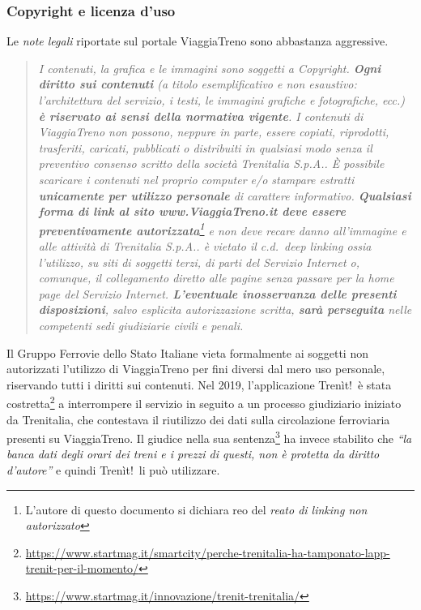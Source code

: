 \documentclass[italian,11pt,a4paper,final]{article}
\begin{document}
	\subsubsection{Copyright e licenza d'uso}
	Le \textit{note legali} riportate sul portale ViaggiaTreno sono abbastanza aggressive.
	\begin{quote}
	\textit{I contenuti, la grafica e le immagini sono soggetti a Copyright. \textbf{Ogni diritto sui contenuti} (a titolo esemplificativo e non esaustivo: l’architettura del servizio, i testi, le immagini grafiche e fotografiche, ecc.) \textbf{è riservato ai sensi della normativa vigente}. I contenuti di ViaggiaTreno non possono, neppure in parte, essere copiati, riprodotti, trasferiti, caricati, pubblicati o distribuiti in qualsiasi modo senza il preventivo consenso scritto della società Trenitalia S.p.A.. È possibile scaricare i contenuti nel proprio computer e/o stampare estratti \textbf{unicamente per utilizzo personale} di carattere informativo. \textbf{Qualsiasi forma di link al sito www.ViaggiaTreno.it deve essere preventivamente autorizzata}\footnote{L'autore di questo documento si dichiara reo del \textit{reato di linking non autorizzato}} e non deve recare danno all'immagine e alle attività di Trenitalia S.p.A.. è vietato il c.d.\ deep linking ossia l'utilizzo, su siti di soggetti terzi, di parti del Servizio Internet o, comunque, il collegamento diretto alle pagine senza passare per la home page del Servizio Internet. \textbf{L'eventuale inosservanza delle presenti disposizioni}, salvo esplicita autorizzazione scritta, \textbf{sarà perseguita} nelle competenti sedi giudiziarie civili e penali.}
	\end{quote}
	Il Gruppo Ferrovie dello Stato Italiane vieta formalmente ai soggetti non autorizzati l'utilizzo di ViaggiaTreno per fini diversi dal mero uso personale, riservando tutti i diritti sui contenuti.
	Nel 2019, l'applicazione Trenìt!\ è stata costretta\footnote{\url{https://www.startmag.it/smartcity/perche-trenitalia-ha-tamponato-lapp-trenit-per-il-momento/}} a interrompere il servizio in seguito a un processo giudiziario iniziato da Trenitalia, che contestava il riutilizzo dei dati sulla circolazione ferroviaria presenti su  ViaggiaTreno.
	Il giudice nella sua sentenza\footnote{\url{https://www.startmag.it/innovazione/trenit-trenitalia/}} ha invece stabilito che \textit{``la banca dati degli orari dei treni e i prezzi di questi, non è protetta da diritto d’autore''} e quindi Trenìt!\ li può utilizzare. \\
\end{document}
